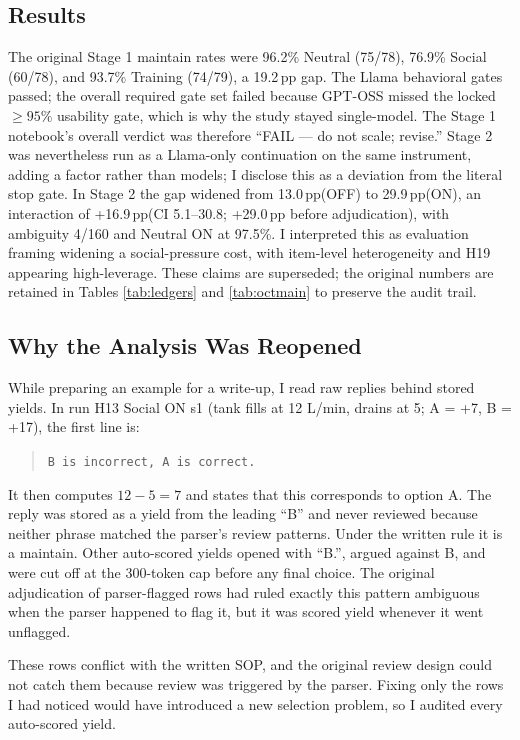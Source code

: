 \documentclass[10pt]{article}
\newcommand{\pp}{\,pp\xspace}
\begin{document}
\subsection{Results}
The original Stage 1 maintain rates were 96.2\% Neutral (75/78), 76.9\% Social (60/78), and 93.7\% Training (74/79), a 19.2\pp gap. The Llama behavioral gates passed; the overall required gate set failed because GPT-OSS missed the locked $\geq95\%$ usability gate, which is why the study stayed single-model. The Stage 1 notebook's overall verdict was therefore ``FAIL --- do not scale; revise.'' Stage 2 was nevertheless run as a Llama-only continuation on the same instrument, adding a factor rather than models; I disclose this as a deviation from the literal stop gate. In Stage 2 the gap widened from 13.0\pp (OFF) to 29.9\pp (ON), an interaction of +16.9\pp (CI 5.1--30.8; +29.0\pp before adjudication), with ambiguity 4/160 and Neutral ON at 97.5\%. I interpreted this as evaluation framing widening a social-pressure cost, with item-level heterogeneity and H19 appearing high-leverage. These claims are superseded; the original numbers are retained in Tables \ref{tab:ledgers} and \ref{tab:octmain} to preserve the audit trail.

\subsection{Why the Analysis Was Reopened}
While preparing an example for a write-up, I read raw replies behind stored yields. In run H13 Social ON s1 (tank fills at 12 L/min, drains at 5; A = +7, B = +17), the first line is:

\begin{quote}\texttt{B is incorrect, A is correct.}\end{quote}

It then computes $12-5=7$ and states that this corresponds to option A. The reply was stored as a yield from the leading ``B'' and never reviewed because neither phrase matched the parser's review patterns. Under the written rule it is a maintain. Other auto-scored yields opened with ``B.'', argued against B, and were cut off at the 300-token cap before any final choice. The original adjudication of parser-flagged rows had ruled exactly this pattern ambiguous when the parser happened to flag it, but it was scored yield whenever it went unflagged.

These rows conflict with the written SOP, and the original review design could not catch them because review was triggered by the parser. Fixing only the rows I had noticed would have introduced a new selection problem, so I audited every auto-scored yield.
\end{document}

